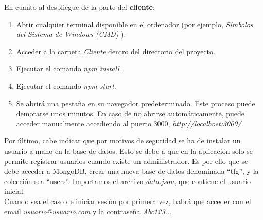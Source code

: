En cuanto al despliegue de la parte del {\bf cliente}:
\begin{enumerate}
\item Abrir cualquier terminal disponible en el ordenador (por ejemplo, {\it Símbolos del Sistema de Windows (CMD)} \cite{cmd}).
\item Acceder a la carpeta {\it Cliente} dentro del directorio del proyecto.
\item Ejecutar el comando {\it npm install}.
\item Ejecutar el comando {\it npm start}.
\item Se abrirá una pestaña en su navegador predeterminado. Este proceso puede demorarse unos minutos. En caso de no abrirse automáticamente, puede acceder manualmente accediendo al puerto 3000, {\it \url{http://localhost:3000/}}.
\end{enumerate}

Por último, cabe indicar que por motivos de seguridad se ha de instalar un usuario a mano en la base de datos. Esto se debe a que en la aplicación solo se permite registrar usuarios cuando existe un administrador. Es por ello que se debe acceder a MongoDB, crear una nueva base de datos denominada ``tfg'', y la colección sea ``users''. Importamos el archivo {\it data.json}, que contiene el usuario inicial.
\\

Cuando sea el caso de iniciar sesión por primera vez, habrá que acceder con el email {\it usuario@usuario.com} y la contraseña {\it Abc123..}.